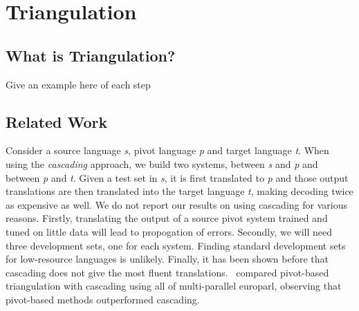 
%
%

\chapter{Triangulation}
\label{chap:triangulation}

\section{What is Triangulation?}
\label{sec:triangulation}
\alert{Give an example here of each step}



\section{Related Work}
 Consider a source language \emph{s}, pivot language \emph{p} and target language \emph{t}. When using the \emph{cascading} approach, we build two systems, between \emph{s} and \emph{p} and between \emph{p} and \emph{t}. Given a test set in \emph{s}, it is first translated to \emph{p} and those output translations are then translated into the target language \emph{t}, making decoding twice as expensive as well. We do not report our results on using cascading for various reasons. Firstly, translating the output of a source pivot system trained and tuned on little data will lead to propogation of errors. Secondly, we will need three development sets, one for each system. Finding standard development sets for low-resource languages is unlikely. Finally, it has been shown before that cascading does not give the most fluent translations.~ compared pivot-based triangulation with cascading using all of multi-parallel europarl, observing that pivot-based methods outperformed cascading.

